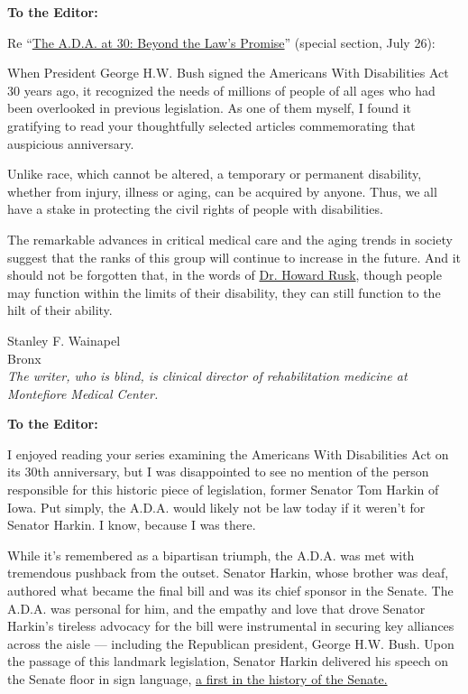 \textbf{To the Editor:}

Re
``\href{https://www.nytimes3xbfgragh.onion/interactive/2020/us/disability-ADA-30-anniversary.html}{The
A.D.A. at 30: Beyond the Law's Promise}'' (special section, July 26):

When President George H.W. Bush signed the Americans With Disabilities
Act 30 years ago, it recognized the needs of millions of people of all
ages who had been overlooked in previous legislation. As one of them
myself, I found it gratifying to read your thoughtfully selected
articles commemorating that auspicious anniversary.

Unlike race, which cannot be altered, a temporary or permanent
disability, whether from injury, illness or aging, can be acquired by
anyone. Thus, we all have a stake in protecting the civil rights of
people with disabilities.

The remarkable advances in critical medical care and the aging trends in
society suggest that the ranks of this group will continue to increase
in the future. And it should not be forgotten that, in the words of
\href{https://www.nytimes3xbfgragh.onion/1989/11/05/obituaries/howard-rusk-88-dies-medical-pioneer.html}{Dr.
Howard Rusk}, though people may function within the limits of their
disability, they can still function to the hilt of their ability.

Stanley F. Wainapel\\
Bronx\\
\emph{The writer, who is blind, is clinical director of rehabilitation
medicine at Montefiore Medical Center.}

\textbf{To the Editor:}

I enjoyed reading your series examining the Americans With Disabilities
Act on its 30th anniversary, but I was disappointed to see no mention of
the person responsible for this historic piece of legislation, former
Senator Tom Harkin of Iowa. Put simply, the A.D.A. would likely not be
law today if it weren't for Senator Harkin. I know, because I was there.

While it's remembered as a bipartisan triumph, the A.D.A. was met with
tremendous pushback from the outset. Senator Harkin, whose brother was
deaf, authored what became the final bill and was its chief sponsor in
the Senate. The A.D.A. was personal for him, and the empathy and love
that drove Senator Harkin's tireless advocacy for the bill were
instrumental in securing key alliances across the aisle --- including
the Republican president, George H.W. Bush. Upon the passage of this
landmark legislation, Senator Harkin delivered his speech on the Senate
floor in sign language,
\href{https://disabilityvisibilityproject.com/2014/07/26/disability-history-senator-harkin-delivers-floor-speech-in-american-sign-language-upon-passage-of-the-ada-71390/}{a
first in the history of the Senate.}


